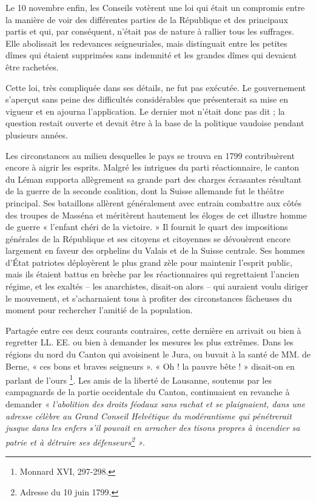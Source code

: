 \documentclass[french,twoside]{book} %
\begin{document}
\noindent Le 10 novembre enfin, les Conseils votèrent une loi qui était un compromis entre la manière de voir des différentes parties de la République et des principaux partis et qui, par conséquent, n’était pas de nature à rallier tous les suffrages. Elle abolissait les redevances seigneuriales, mais distinguait entre les petites dîmes qui étaient supprimées sans indemnité et les grandes dîmes qui devaient être rachetées.\par
Cette loi, très compliquée dans ses détails, ne fut pas exécutée. Le gouvernement s’aperçut sans peine des difficultés considérables que présenterait sa mise en vigueur et en ajourna l’application. Le dernier mot n’était donc pas dit ; la question restait ouverte et devait être à la base de la politique vaudoise pendant plusieurs années.\par
Les circonstances au milieu desquelles le pays se trouva en 1799 contribuèrent encore à aigrir les esprits. Malgré les intrigues du parti réactionnaire, le canton du Léman supporta allègrement sa grande part des charges écrasantes résultant de la guerre de la seconde coalition, dont la Suisse allemande fut le théâtre principal. Ses bataillons allèrent généralement avec entrain combattre aux côtés des troupes de Masséna et méritèrent hautement les éloges de cet illustre homme de guerre « l’enfant chéri de la victoire. » Il fournit le quart des impositions générales de la République et ses citoyens et citoyennes se dévouèrent encore largement en faveur des orphelins du Valais et de la Suisse centrale. Ses hommes d’État patriotes déployèrent le plus grand zèle pour maintenir l’esprit public, mais ils étaient battus en brèche par les réactionnaires qui regrettaient l’ancien régime, et les exaltés – les anarchistes, disait-on alors – qui auraient voulu diriger le mouvement, et s’acharnaient tous à profiter des circonstances fâcheuses du moment pour rechercher l’amitié de la population.\par
Partagée entre ces deux courants contraires, cette dernière en arrivait ou bien à regretter LL. EE. ou bien à demander les mesures les plus extrêmes. Dans les régions du nord du Canton qui avoisinent le Jura, ou buvait à la santé de MM. de Berne, « ces bons et braves seigneurs ». « Oh ! la pauvre bête ! » disait-on en parlant de l’ours \footnote{Monnard XVI, 297-298.}. Les amis de la liberté de Lausanne, soutenus par les campagnards de la partie occidentale du Canton, continuaient en revanche à demander \emph{« l’abolition des droits féodaux sans rachat et se plaignaient, dans une adresse célèbre au Grand Conseil Helvétique du modérantisme qui pénétrerait jusque dans les enfers s’il pouvait en arracher des tisons propres à incendier sa patrie et à détruire ses défenseurs\footnote{Adresse du 10 juin 1799.} »}.
\end{document}
